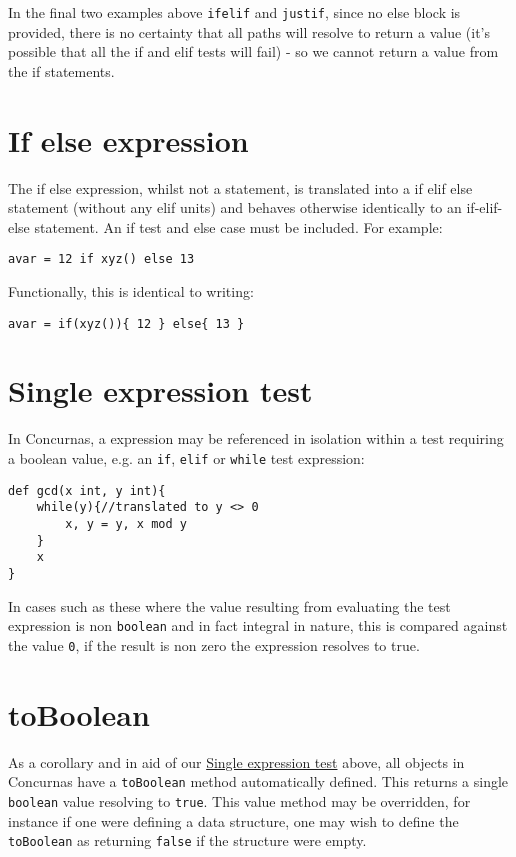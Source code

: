 \documentclass[conc-doc]{subfiles}
\begin{document}
In the final two examples above \lstinline{ifelif} and \lstinline{justif}, since no else block is provided, there is no certainty that all paths will resolve to return a value (it's possible that all the if and elif tests will fail) - so we cannot return a value from the if statements.


\section{If else expression}
The if else expression, whilst not a statement, is translated into a if elif else statement (without any elif units) and behaves otherwise identically to an if-elif-else statement. An if test and else case must be included. For example:

\begin{lstlisting}
avar = 12 if xyz() else 13
\end{lstlisting}

Functionally, this is identical to writing:

\begin{lstlisting}
avar = if(xyz()){ 12 } else{ 13 }
\end{lstlisting}

\section{Single expression test}
\label{sec:singleexprtest}
In Concurnas, a expression may be referenced in isolation within a test requiring a boolean value, e.g. an \lstinline{if}, \lstinline{elif} or \lstinline{while} test expression:

\begin{lstlisting}
def gcd(x int, y int){
	while(y){//translated to y <> 0
		x, y = y, x mod y
	}
	x
}
\end{lstlisting}

In cases such as these where the value resulting from evaluating the test expression is non \lstinline{boolean} and in fact integral in nature, this is compared against the value \lstinline{0}, if the result is non zero the expression resolves to true.

\section{toBoolean}
As a corollary and in aid of our \hyperref[sec:singleexprtest]{Single expression test} above, all objects in Concurnas have a \lstinline{toBoolean} method automatically defined. This returns a single \lstinline{boolean} value resolving to \lstinline{true}. This value method may be overridden, for instance if one were defining a data structure, one may wish to define the \lstinline{toBoolean} as returning \lstinline{false} if the structure were empty.
\end{document}
